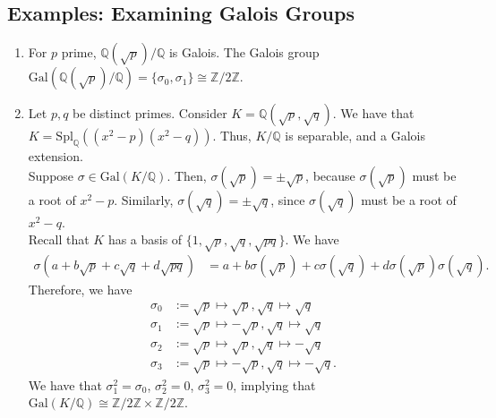 \documentclass[10pt]{extarticle}
\newcommand{\Q}{\mathbb{Q}}
\newcommand{\Z}{\mathbb{Z}}
\begin{document}
  \subsection{Examples: Examining Galois Groups}%
  \begin{enumerate}[(1)]
    \item For $p$ prime, $\Q(\sqrt{p})/\Q$ is Galois. The Galois group $\text{Gal}(\Q(\sqrt{p}) / \Q) = \{\sigma_0,\sigma_1\} \cong \Z/2\Z$.
    \item Let $p,q$ be distinct primes. Consider $K = \Q(\sqrt{p},\sqrt{q})$. We have that $K = \text{Spl}_{\Q}((x^2 - p)(x^2 - q))$. Thus, $K/\Q$ is separable, and a Galois extension.\\

      Suppose $\sigma \in \text{Gal}(K/\Q)$. Then, $\sigma(\sqrt{p}) = \pm \sqrt{p}$, because $\sigma(\sqrt{p})$ must be a root of $x^2 - p$. Similarly, $\sigma(\sqrt{q}) = \pm \sqrt{q}$, since $\sigma(\sqrt{q})$ must be a root of $x^2 - q$.\\

      Recall that $K$ has a basis of $\{1,\sqrt{p},\sqrt{q},\sqrt{pq}\}$. We have
      \begin{align*}
        \sigma(a + b\sqrt{p} + c\sqrt{q} + d\sqrt{pq}) &= a + b\sigma(\sqrt{p}) + c\sigma(\sqrt{q}) + d\sigma(\sqrt{p})\sigma(\sqrt{q}).
      \end{align*}
      Therefore, we have
      \begin{align*}
        \sigma_0 &:=\sqrt{p}\mapsto \sqrt{p},\sqrt{q}\mapsto \sqrt{q}\\
        \sigma_1 &:=\sqrt{p}\mapsto -\sqrt{p},\sqrt{q}\mapsto \sqrt{q}\\
        \sigma_2 &:=\sqrt{p}\mapsto \sqrt{p},\sqrt{q}\mapsto -\sqrt{q}\\
        \sigma_3 &:=\sqrt{p}\mapsto -\sqrt{p},\sqrt{q}\mapsto -\sqrt{q}.
      \end{align*}
      We have that $\sigma_1^2 = \sigma_0$, $\sigma_2^2 = 0$, $\sigma_3^2 = 0$, implying that $\text{Gal}(K/\Q)\cong \Z/2\Z \times \Z/2\Z$.\\


\end{enumerate}
\end{document}
